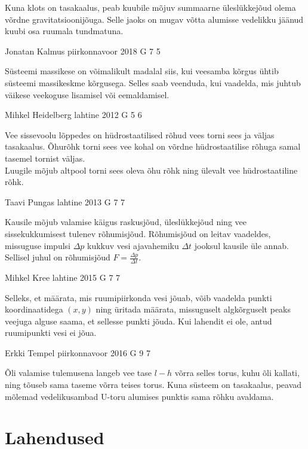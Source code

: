 \documentclass[11pt]{article}
\begin{document}
{{\ifHint
Kuna klots on tasakaalus, peab kuubile mõjuv summaarne üleslükkejõud olema võrdne gravitatsioonijõuga. Selle jaoks on mugav võtta alumisse vedelikku jäänud kuubi osa ruumala tundmatuna.
\fi
}

{Jonatan Kalmus} %
{piirkonnavoor} %
{2018} %
{G 7} %
{5} %
{

\ifHint
Süsteemi massikese on võimalikult madalal siis, kui veesamba kõrgus ühtib süsteemi massikeskme kõrgusega. Selles saab veenduda, kui vaadelda, mis juhtub väikese veekoguse lisamisel või eemaldamisel.
\fi
}

{Mihkel Heidelberg} %
{lahtine} %
{2012} %
{G 5} %
{6} %
{

\ifHint
\osa Vee sissevoolu lõppedes on hüdrostaatilised rõhud vees torni sees ja väljas tasakaalus. Õhurõhk torni sees vee kohal on võrdne hüdrostaatilise rõhuga samal tasemel tornist väljas.\\
\osa Luugile mõjub altpool torni sees oleva õhu rõhk ning ülevalt vee hüdrostaatiline rõhk.
\fi
}

{Taavi Pungas} %
{lahtine} %
{2013} %
{G 7} %
{7} %
{

\ifHint
Kausile mõjub valamise käigus raskusjõud, üleslükkejõud ning vee sissekukkumisest tulenev rõhumisjõud. Rõhumisjõud on leitav vaadeldes, missuguse impulsi $\Delta p$ kukkuv vesi ajavahemiku $\Delta t$ jooksul kausile üle annab. Sellisel juhul on rõhumisjõud $F = \frac{\Delta p}{\Delta t}$.
\fi
}

{Mihkel Kree} %
{lahtine} %
{2015} %
{G 7} %
{7} %
{

\ifHint
Selleks, et määrata, mis ruumipiirkonda vesi jõuab, võib vaadelda punkti koordinaatidega $(x, y)$ ning üritada määrata, missuguselt algkõrguselt peaks veejuga alguse saama, et sellesse punkti jõuda. Kui lahendit ei ole, antud ruumipunkti vesi ei jõua.
\fi
}

{Erkki Tempel} %
{piirkonnavoor} %
{2016} %
{G 9} %
{7} %
{

\ifHint
Õli valamise tulemusena langeb vee tase $l - h$ võrra selles torus, kuhu õli kallati, ning tõuseb sama taseme võrra teises torus. Kuna süsteem on tasakaalus, peavad mõlemad vedelikusambad U-toru alumises punktis sama rõhku avaldama.
\fi
}
\newpage\section{Lahendused}
        \ToggleSolution
        
}
\end{document}
